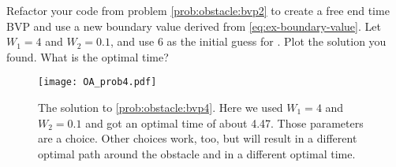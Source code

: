 \begin{problem}
\label{prob:obstacle:bvp4}
Refactor your code from problem \ref{prob:obstacle:bvp2} to create a free end time BVP and use a new boundary value derived from \ref{eq:ex-boundary-value}. Let $W_1 = 4$ and $W_2 = 0.1$, and use $6$ as the initial guess for .
Plot the solution you found.
What is the optimal time?
\end{problem}

\begin{figure}[H]
    \centering
    \texttt{[image: OA\_prob4.pdf]}
    \caption{The solution to \ref{prob:obstacle:bvp4}.  Here we used $W_1 = 4$ and $W_2 = 0.1$ and got an optimal time of about 4.47.  Those parameters are a choice.  Other choices work, too, but will result in a different optimal path around the obstacle and in a different optimal time.}
\end{figure}
